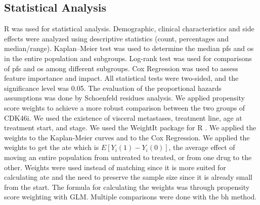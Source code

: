  
\begin{table}
\caption{Descriptive statistics of \ac{cdk46i} group and \ac{et} group. The Drug/combination refers to the actual drug or the combination for CDK4/6}
\centering
\label{tab:stats_ipop_cdk}

\end{table}




\subsection{Statistical Analysis}
R was used for statistical analysis. Demographic, clinical characteristics and side effects were analyzed using descriptive statistics (count, percentages and median/range). Kaplan–Meier test was used to determine the median \ac{pfs} and \ac{os} in the entire population and subgroups. Log-rank test was used for comparisons of \ac{pfs} and \ac{os} among different subgroups. Cox Regression was used to assess feature importance and impact. All statistical tests were two-sided, and the significance level was 0.05. The evaluation of the proportional hazards assumptions was done by Schoenfeld residues analysis.
We applied propensity score weights to achieve a more robust comparison between the two groups of CDK4\/6i. We used the existence of visceral metastases, treatment line, age at treatment start, and stage. We used the WeightIt package for R \cite{WeightIt}. We applied the weights to the Kaplan-Meier curves and to the Cox Regression. We applied the weights to get the \ac{ate} which is $E[Y_i(1)-Y_i(0)]$, the average effect of moving an entire population from untreated to treated, or from one drug to the other. Weights were used instead of matching since it is more suited for calculating \ac{ate} and the need to preserve the sample size since it is already small from the start. The formula for calculating the weights was through propensity score weighting with GLM. Multiple comparisons were done with the \ac{bh} method. 




